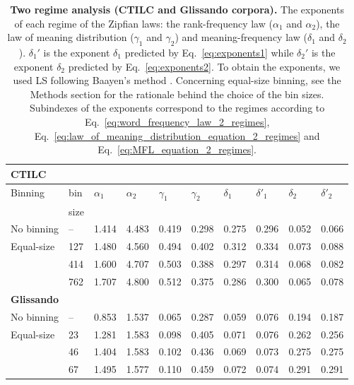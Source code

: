 \documentclass[10pt,letterpaper]{article}
\begin{document}
\begin{table}[!ht]
\centering
\small
\begin{tabular}{l l l l l l l l l l}
\hline
\hline
\textbf{CTILC}  &  &  &  &  &   &  &  &  &  \\
\hline
Binning & bin & $\alpha_1$ & $\alpha_2$ & $\gamma_1$ & $\gamma_2$ & $\delta_1$ & $\delta'_1$ & $\delta_2$ & $\delta'_2$  \\
 & size &  &  &  &  &  &  &  &  \\
\hline
No binning  & --  & 1.414 & 4.483 & 0.419 & 0.298 & \cellcolor{Gray}0.275 & \cellcolor{Gray}0.296 & \cellcolor{LGray}0.052 & \cellcolor{LGray}0.066  \\
\hline
Equal-size  & 127  & 1.480 & 4.560 & 0.494 & 0.402 & \cellcolor{Gray}0.312 & \cellcolor{Gray}0.334 & \cellcolor{LGray}0.073 & \cellcolor{LGray}0.088  \\
            & 414  & 1.600 & 4.707 & 0.503 & 0.388 & \cellcolor{Gray}0.297 & \cellcolor{Gray}0.314 & \cellcolor{LGray}0.068 & \cellcolor{LGray}0.082 \\
            & 762  & 1.707 & 4.800 & 0.512 & 0.375 & \cellcolor{Gray}0.286 & \cellcolor{Gray}0.300 & \cellcolor{LGray}0.065 & \cellcolor{LGray}0.078 \\
\hline
\hline
\textbf{Glissando} &  &  &  &  &   &  &  &  &  \\
\hline
No binning  & --  & 0.853 & 1.537 & 0.065 & 0.287 & \cellcolor{Gray}0.059 & \cellcolor{Gray}0.076 & \cellcolor{LGray}0.194 & \cellcolor{LGray}0.187  \\
\hline
Equal-size  & 23  & 1.281  & 1.583 & 0.098 & 0.405 & \cellcolor{Gray}0.071 &  \cellcolor{Gray}0.076 & \cellcolor{LGray}0.262 & \cellcolor{LGray}0.256  \\
            & 46  & 1.404  & 1.583 & 0.102 & 0.436 & \cellcolor{Gray}0.069 & \cellcolor{Gray}0.073 & \cellcolor{LGray}0.275 & \cellcolor{LGray}0.275  \\
            & 67  & 1.495  & 1.577 & 0.110 & 0.459 & \cellcolor{Gray}0.072 & \cellcolor{Gray}0.074 & \cellcolor{LGray}0.291 & \cellcolor{LGray}0.291  \\
\hline
\end{tabular}

\caption{\textbf{Two regime analysis (CTILC and Glissando corpora).} The exponents of each regime of the Zipfian laws: the rank-frequency law ($\alpha_1$ and $\alpha_2$), the law of meaning distribution ($\gamma_1$ and $\gamma_2$) and meaning-frequency law ($\delta_1$ and $\delta_2$). $\delta_1'$ is the exponent $\delta_1$ predicted by Eq.~\ref{eq:exponents1} while 
$\delta_2'$ is the exponent $\delta_2$ predicted by Eq.~\ref{eq:exponents2}. To obtain the exponents, we used LS following Baayen's method \cite{baayen2008ald}. Concerning equal-size binning, see the Methods section for the rationale behind the choice of the bin sizes.
Subindexes of the exponents correspond to the regimes according to Eq.~\ref{eq:word_frequency_law_2_regimes}, Eq.~\ref{eq:law_of_meaning_distribution_equation_2_regimes} and Eq.~\ref{eq:MFL_equation_2_regimes}.}
\label{exponents_tworegime}
\end{table}
\end{document}
